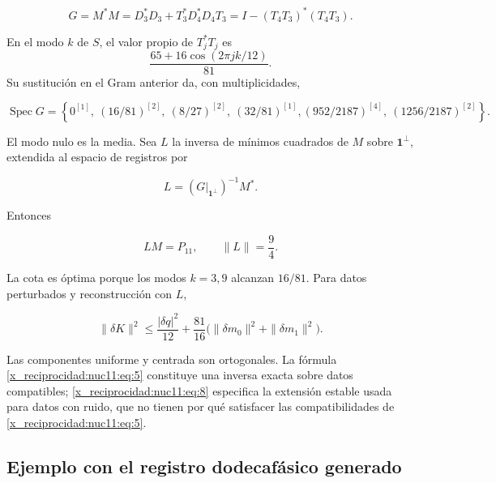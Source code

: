 \begin{equation}
G=M^*M=D_3^*D_3+T_3^*D_4^*D_4T_3
=I-(T_4T_3)^*(T_4T_3).
\label{x_reciprocidad:nuc11:eq:6}
\end{equation}



En el modo \(k\) de \(S\), el valor propio de \(T_j^*T_j\) es
\[
 \frac{65+16\cos(2\pi jk/12)}{81}.
\]
Su sustitución en el Gram anterior da, con multiplicidades,



\begin{equation}
\operatorname{Spec}G=\left\{
0^{[1]},\ (16/81)^{[2]},\ (8/27)^{[2]},\ (32/81)^{[1]},
(952/2187)^{[4]},\ (1256/2187)^{[2]}\right\}.
\label{x_reciprocidad:nuc11:eq:7}
\end{equation}



El modo nulo es la media. Sea \(L\) la inversa de mínimos cuadrados
de \(M\) sobre \(\mathbf1^\perp\), extendida al espacio de
registros por



\[
L=(G|_{\mathbf1^\perp})^{-1}M^*.
\]



Entonces



\begin{equation}
LM=P_{11},\qquad \|L\|=\frac94.
\label{x_reciprocidad:nuc11:eq:8}
\end{equation}



La cota es óptima porque los modos \(k=3,9\) alcanzan \(16/81\).
Para datos perturbados y reconstrucción con \(L\),



\begin{equation}
\|\delta K\|^2\le \frac{|\delta q|^2}{12}
+\frac{81}{16}\bigl(\|\delta m_0\|^2+\|\delta m_1\|^2\bigr).
\label{x_reciprocidad:nuc11:eq:9}
\end{equation}



Las componentes uniforme y centrada son ortogonales. La fórmula \eqref{x_reciprocidad:nuc11:eq:5} constituye una inversa exacta sobre datos compatibles; \eqref{x_reciprocidad:nuc11:eq:8} especifica la extensión estable usada para datos con ruido, que no tienen por qué satisfacer las compatibilidades de \eqref{x_reciprocidad:nuc11:eq:5}.

\subsection{Ejemplo con el registro dodecafásico generado}

